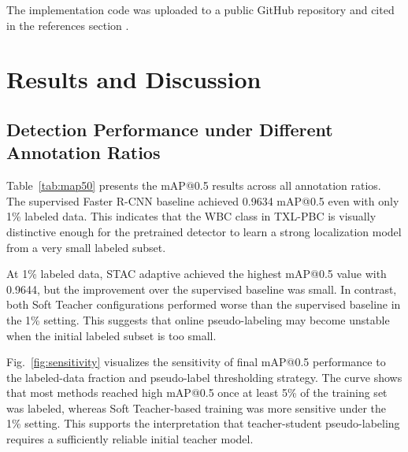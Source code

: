 \documentclass[conference,a4paper]{IEEEtran}
\begin{document}
The implementation code was uploaded to a public GitHub repository and cited in the references section \cite{githubrepo}.

\section{Results and Discussion}

\subsection{Detection Performance under Different Annotation Ratios}
Table~\ref{tab:map50} presents the mAP@0.5 results across all annotation ratios. The supervised Faster R-CNN baseline achieved 0.9634 mAP@0.5 even with only 1\% labeled data. This indicates that the WBC class in TXL-PBC is visually distinctive enough for the pretrained detector to learn a strong localization model from a very small labeled subset.

\begin{table}[!t]
\caption{Test mAP@0.5 results across labeled-data fractions.}
\label{tab:map50}
\centering
{}
\end{table}

At 1\% labeled data, STAC adaptive achieved the highest mAP@0.5 value with 0.9644, but the improvement over the supervised baseline was small. In contrast, both Soft Teacher configurations performed worse than the supervised baseline in the 1\% setting. This suggests that online pseudo-labeling may become unstable when the initial labeled subset is too small.

Fig.~\ref{fig:sensitivity} visualizes the sensitivity of final mAP@0.5 performance to the labeled-data fraction and pseudo-label thresholding strategy. The curve shows that most methods reached high mAP@0.5 once at least 5\% of the training set was labeled, whereas Soft Teacher-based training was more sensitive under the 1\% setting. This supports the interpretation that teacher-student pseudo-labeling requires a sufficiently reliable initial teacher model.
\end{document}

